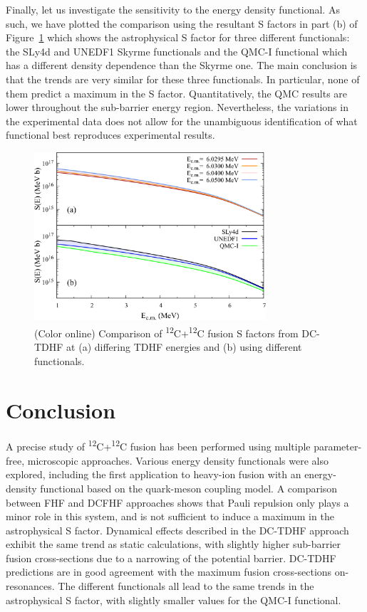 Finally, let us investigate the sensitivity to the energy density functional. 
As such, we have plotted the comparison using the resultant S factors in part (b) of Figure~\ref{fig:sfaccomp} which shows the astrophysical S factor for three different functionals: the SLy4d \protect\cite{kim1997} and UNEDF1 \protect\cite{kortelainen2012} Skyrme functionals and the QMC-I functional which has a different density dependence than the Skyrme one. 
The main conclusion is that the trends are very similar for these three functionals. In particular, none of them predict a maximum in the S factor. 
Quantitatively, the QMC results are lower throughout the sub-barrier energy region.
Nevertheless, the variations in the experimental data does not allow for the unambiguous identification of what functional best reproduces experimental results.

\begin{figure}
	\includegraphics*[width=8.6cm]{../Figures/SFactorsComp.pdf}
	\caption{(Color online) Comparison of \textsuperscript{12}C+\textsuperscript{12}C fusion S factors from DC-TDHF at (a) differing TDHF energies and (b) using different functionals.}
	\label{fig:sfaccomp}
\end{figure}


\section{Conclusion}
\label{sec:conclusion}
A precise study of \textsuperscript{12}C+\textsuperscript{12}C fusion has been performed using multiple parameter-free, microscopic approaches. 
Various energy density functionals were also explored, including the first application to heavy-ion fusion with an energy-density functional based on the quark-meson coupling model.
A comparison between FHF and DCFHF approaches shows that Pauli repulsion only plays a minor role in this system, and is not sufficient to induce a maximum in the astrophysical S factor. 
Dynamical effects described in the DC-TDHF approach exhibit the same trend as static calculations, with slightly higher sub-barrier fusion cross-sections due to a narrowing of the potential barrier. 
DC-TDHF predictions are in good agreement with the maximum fusion cross-sections on-resonances. 
The different functionals all lead to the same trends in the astrophysical S factor, with slightly smaller values for the QMC-I functional. 

